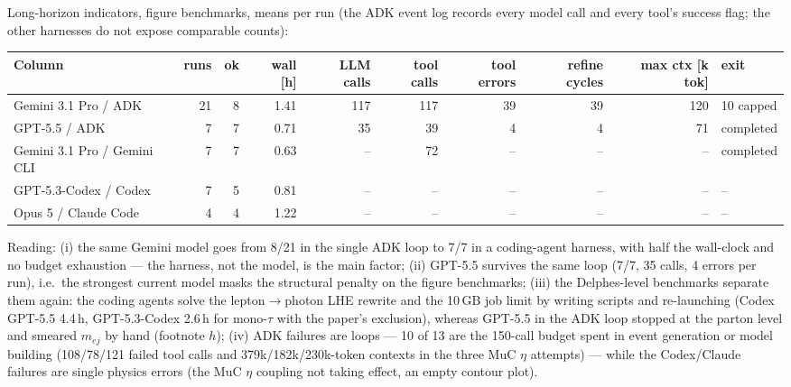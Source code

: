 \documentclass[11pt]{article}
\begin{document}
Long-horizon indicators, figure benchmarks, means per run (the ADK event log records every model call and every tool's
success flag; the other harnesses do not expose comparable counts):

\begin{center}\scriptsize\setlength{\tabcolsep}{3pt}
\begin{tabular}{lrrrrrrrrl}
\toprule
Column & runs & ok & wall [h] & LLM calls & tool calls & tool errors & refine cycles & max ctx [k tok] & exit \\
\midrule
Gemini 3.1 Pro / ADK & 21 & 8 & 1.41 & 117 & 117 & 39 & 39 & 120 & 10 capped \\
GPT-5.5 / ADK & 7 & 7 & 0.71 & 35 & 39 & 4 & 4 & 71 & completed \\
Gemini 3.1 Pro / Gemini CLI & 7 & 7 & 0.63 & -- & 72 & -- & -- & -- & completed \\
GPT-5.3-Codex / Codex & 7 & 5 & 0.81 & -- & -- & -- & -- & -- & -- \\
Opus 5 / Claude Code & 4 & 4 & 1.22 & -- & -- & -- & -- & -- & -- \\
\bottomrule
\end{tabular}
\end{center}

Reading: (i) the same Gemini model goes from 8/21 in the single ADK loop to 7/7 in a coding-agent harness, with half the
wall-clock and no budget exhaustion --- the harness, not the model, is the main factor; (ii) GPT-5.5 survives the same
loop (7/7, 35 calls, 4 errors per run), i.e.\ the strongest current model masks the structural penalty on the figure
benchmarks; (iii) the Delphes-level benchmarks separate them again: the coding agents solve the lepton$\to$photon LHE
rewrite and the 10\,GB job limit by writing scripts and re-launching (Codex GPT-5.5 4.4\,h, GPT-5.3-Codex 2.6\,h for
mono-$\tau$ with the paper's exclusion), whereas GPT-5.5 in the ADK loop stopped at the parton level and smeared
$m_{ej}$ by hand (footnote $h$); (iv) ADK failures are loops --- 10 of 13 are the 150-call budget spent in event
generation or model building (108/78/121 failed tool calls and 379k/182k/230k-token contexts in the three MuC $\eta$
attempts) --- while the Codex/Claude failures are single physics errors (the MuC $\eta$ coupling not taking effect, an
empty contour plot).
\end{document}
